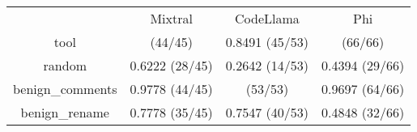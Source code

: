\begin{table}[h!]
\centering
\begin{tabular}{|c|c|c|c|}
\hline
 & Mixtral & CodeLlama & Phi \\

tool & \cellcolor{blue!10}{0.9778} (44/45) & 0.8491 (45/53) & \cellcolor{blue!10}{1.0000} (66/66) \\

random & 0.6222 (28/45) & 0.2642 (14/53) & 0.4394 (29/66) \\

benign_comments & 0.9778 (44/45) & \cellcolor{blue!10}{1.0000} (53/53) & 0.9697 (64/66) \\

benign_rename & 0.7778 (35/45) & 0.7547 (40/53) & 0.4848 (32/66) \\

\end{tabular}
\end{table}